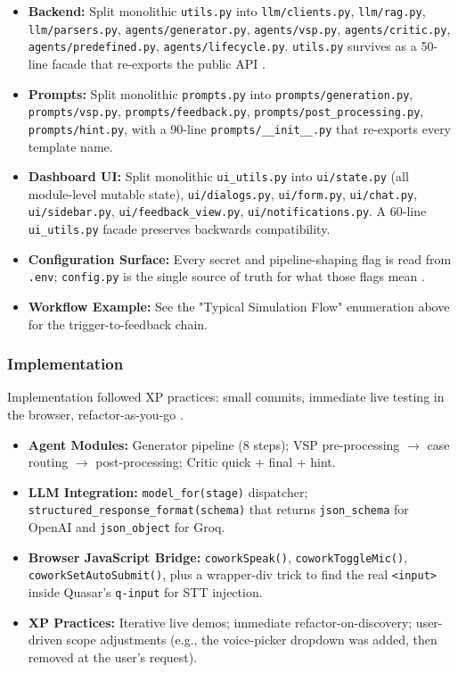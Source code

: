 \documentclass{article}
\begin{document}
\begin{itemize}
    \item \textbf{Backend:} Split monolithic \texttt{utils.py} into \texttt{llm/clients.py}, \texttt{llm/rag.py}, \texttt{llm/parsers.py}, \texttt{agents/generator.py}, \texttt{agents/vsp.py}, \texttt{agents/critic.py}, \texttt{agents/predefined.py}, \texttt{agents/lifecycle.py}. \texttt{utils.py} survives as a 50-line facade that re-exports the public API \cite{Cheptsov2013IntroducingAN}.

    \item \textbf{Prompts:} Split monolithic \texttt{prompts.py} into \texttt{prompts/generation.py}, \texttt{prompts/vsp.py}, \texttt{prompts/feedback.py}, \texttt{prompts/post\_processing.py}, \texttt{prompts/hint.py}, with a 90-line \texttt{prompts/\_\_init\_\_.py} that re-exports every template name.

    \item \textbf{Dashboard UI:} Split monolithic \texttt{ui\_utils.py} into \texttt{ui/state.py} (all module-level mutable state), \texttt{ui/dialogs.py}, \texttt{ui/form.py}, \texttt{ui/chat.py}, \texttt{ui/sidebar.py}, \texttt{ui/feedback\_view.py}, \texttt{ui/notifications.py}. A 60-line \texttt{ui\_utils.py} facade preserves backwards compatibility.

    \item \textbf{Configuration Surface:} Every secret and pipeline-shaping flag is read from \texttt{.env}; \texttt{config.py} is the single source of truth for what those flags mean \cite{Shen2019ALA}.

    \item \textbf{Workflow Example:} See the "Typical Simulation Flow" enumeration above for the trigger-to-feedback chain.
\end{itemize}

\subsubsection{Implementation}
Implementation followed XP practices: small commits, immediate live testing in the browser, refactor-as-you-go \cite{Stokes2015ScalingNA}.

\begin{itemize}
    \item \textbf{Agent Modules:} Generator pipeline (8 steps); VSP pre-processing $\rightarrow$ case routing $\rightarrow$ post-processing; Critic quick + final + hint.
    \item \textbf{LLM Integration:} \texttt{model\_for(stage)} dispatcher; \texttt{structured\_response\_format(schema)} that returns \texttt{json\_schema} for OpenAI and \texttt{json\_object} for Groq.
    \item \textbf{Browser JavaScript Bridge:} \texttt{coworkSpeak()}, \texttt{coworkToggleMic()}, \texttt{coworkSetAutoSubmit()}, plus a wrapper-div trick to find the real \texttt{<input>} inside Quasar's \texttt{q-input} for STT injection.
    \item \textbf{XP Practices:} Iterative live demos; immediate refactor-on-discovery; user-driven scope adjustments (e.g., the voice-picker dropdown was added, then removed at the user's request).
\end{itemize}
\end{document}
